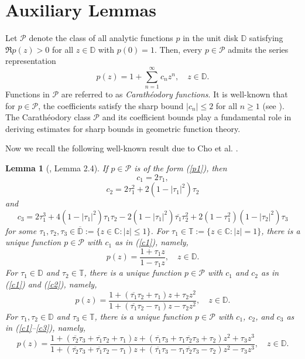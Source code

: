 \documentclass[10pt,a4paper]{amsart}
\newtheorem{lem}{Lemma}[section]
\newcommand{\ol}{\overline}
\numberwithin{equation}{section}
\begin{document}
\section{Auxiliary Lemmas}
Let $\mathcal{P}$ denote the class of all analytic functions $p$ in the unit disk $\mathbb{D}$ satisfying $\Re p(z) > 0$ for all $z \in \mathbb{D}$ with $p(0) = 1$. Then, every $p \in \mathcal{P}$ admits the series representation
\begin{equation}\label{p1}
p(z) = 1 + \sum_{n=1}^{\infty} c_n z^n, \quad z \in \mathbb{D}.
\end{equation}
Functions in $\mathcal{P}$ are referred to as \emph{Carath\'{e}odory functions}. It is well-known that for $p \in \mathcal{P}$, the coefficients satisfy the sharp bound $|c_n| \leq 2$ for all $n \geq 1$ (see \cite{PLD1}). The Carath\'{e}odory class $\mathcal{P}$ and its coefficient bounds play a fundamental role in deriving estimates for sharp bounds in geometric function theory.

Now we recall the following well-known result due to Cho et al. \cite{C12}.

\begin{lem}[\cite{C12}, Lemma 2.4]\label{L1}
If $p\in\mathcal{P}$ is of the form (\ref{p1}), then
\begin{equation}\label{c1} c_1 =2\tau_1, \end{equation}
\begin{equation}\label{c2} c_2=2\tau_1^2 + 2(1 - |\tau_1|^2)\tau_2 \end{equation}
and
\begin{equation}\label{c3} c_3 = 2\tau_1^3+4(1-|\tau_1|^2)\tau_1\tau_2 - 2(1 - |\tau_1|^2)\ol{\tau_1}\tau_2^2 + 2(1 - \tau_1^2)(1 - |\tau_2|^2)\tau_3 \end{equation}
for some $\tau_1, \tau_2, \tau_3 \in\ol{\mathbb{D}}:= \{z \in \mathbb{C}: |z| \leq 1 \}$.
For $ \tau_1 \in \mathbb{T} := \{ z \in \mathbb{C} : |z| = 1 \} $, there is a unique function $ p \in \mathcal{P} $ with $ c_1 $ as in (\ref{c1}), namely,
\[
p(z) = \frac{1 + \tau_1 z}{1 - \tau_1 z}, \quad z \in \mathbb{D}.
\]
For $ \tau_1 \in \mathbb{D} $ and $ \tau_2 \in \mathbb{T} $, there is a unique function $ p \in \mathcal{P} $ with $ c_1 $ and $ c_2 $ as in (\ref{c1}) and (\ref{c2}), namely,
\[
p(z) = \frac{1 + (\ol{\tau_1} \tau_2 + \tau_1) z + \tau_2 z^2}{1 + (\ol{\tau_1} \tau_2 - \tau_1) z - \tau_2 z^2}, \quad z \in \mathbb{D}.
\]
For $ \tau_1, \tau_2 \in \mathbb{D} $ and $ \tau_3 \in \mathbb{T} $, there is a unique function $ p \in \mathcal{P} $ with $ c_1 $, $ c_2 $, and $ c_3 $ as in (\ref{c1}--\ref{c3}), namely,
\[
p(z) = \frac{1 + (\ol{\tau_2} \tau_3 + \ol{\tau_1} \tau_2 + \tau_1)z+(\ol{\tau_1}\tau_3+\tau_1\ol{\tau_2}\tau_3+\tau_2)z^2+\tau_3z^3}{1+(\ol{\tau_2}\tau_3+\ol{\tau_1}\tau_2-\tau_1)z+(\ol{\tau_1}\tau_3-\tau_1\ol{\tau_2}\tau_3-\tau_2)z^2-\tau_3z^3},\quad z\in\mathbb{D}.
\]
\end{lem}
\end{document}

